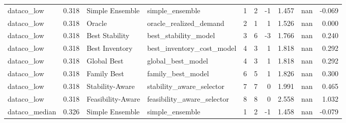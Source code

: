 \begin{table}
{\begin{tabular}{lrllrrrrrr}
    dataco\_low &             0.318 &    Simple Ensemble &             simple\_ensemble &                              1 &                                       2 &                       -1 &                  1.457 &               nan &                 -0.069 \\
    dataco\_low &             0.318 &             Oracle &      oracle\_realized\_demand &                              2 &                                       1 &                        1 &                  1.526 &               nan &                  0.000 \\
    dataco\_low &             0.318 &     Best Stability &        best\_stability\_model &                              3 &                                       6 &                       -3 &                  1.766 &               nan &                  0.240 \\
    dataco\_low &             0.318 &     Best Inventory &   best\_inventory\_cost\_model &                              4 &                                       3 &                        1 &                  1.818 &               nan &                  0.292 \\
    dataco\_low &             0.318 &        Global Best &           global\_best\_model &                              4 &                                       3 &                        1 &                  1.818 &               nan &                  0.292 \\
    dataco\_low &             0.318 &        Family Best &           family\_best\_model &                              6 &                                       5 &                        1 &                  1.826 &               nan &                  0.300 \\
    dataco\_low &             0.318 &    Stability-Aware &    stability\_aware\_selector &                              7 &                                       7 &                        0 &                  1.991 &               nan &                  0.465 \\
    dataco\_low &             0.318 &  Feasibility-Aware &  feasibility\_aware\_selector &                              8 &                                       8 &                        0 &                  2.558 &               nan &                  1.032 \\
 dataco\_median &             0.326 &    Simple Ensemble &             simple\_ensemble &                              1 &                                       2 &                       -1 &                  1.458 &               nan &                 -0.079 \\

\end{tabular}}
\end{table}
